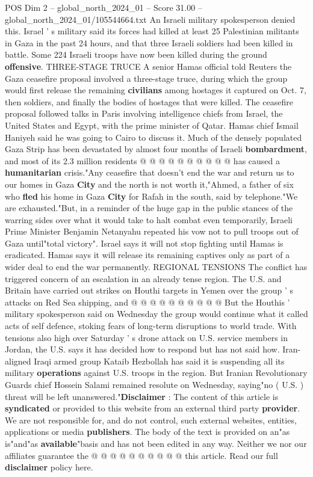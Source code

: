 \begin{textsample}{POS Dim 2 – global\_north\_2024\_01 – Score 31.00 – global\_north\_2024\_01/105544664.txt}
An Israeli military spokesperson denied this.
Israel ' s military said its forces had killed at least 25 Palestinian militants in Gaza in the past 24 hours, and that three Israeli soldiers had been killed in battle.
Some 224 Israeli troops have now been killed during the ground \textbf{offensive}.
THREE-STAGE TRUCE A senior Hamas official told Reuters the Gaza ceasefire proposal involved a three-stage truce, during which the group would first release the remaining \textbf{civilians} among hostages it captured on Oct. 7, then soldiers, and finally the bodies of hostages that were killed.
The ceasefire proposal followed talks in Paris involving intelligence chiefs from Israel, the United States and Egypt, with the prime minister of Qatar.
Hamas chief Ismail Haniyeh said he was going to Cairo to discuss it.
Much of the densely populated Gaza Strip has been devastated by almost four months of Israeli \textbf{bombardment}, and most of its 2.3 million residents @ @ @ @ @ @ @ @ @ @ has caused a \textbf{humanitarian} crisis."Any ceasefire that doesn't end the war and return us to our homes in Gaza \textbf{City} and the north is not worth it,"Ahmed, a father of six who \textbf{fled} his home in Gaza \textbf{City} for Rafah in the south, said by telephone."We are exhausted."But, in a reminder of the huge gap in the public stances of the warring sides over what it would take to halt combat even temporarily, Israeli Prime Minister Benjamin Netanyahu repeated his vow not to pull troops out of Gaza until"total victory".
Israel says it will not stop fighting until Hamas is eradicated.
Hamas says it will release its remaining captives only as part of a wider deal to end the war permanently.
REGIONAL TENSIONS The conflict has triggered concern of an escalation in an already tense region.
The U.S. and Britain have carried out strikes on Houthi targets in Yemen over the group ' s attacks on Red Sea shipping, and @ @ @ @ @ @ @ @ @ @ But the Houthis ' military spokesperson said on Wednesday the group would continue what it called acts of self defence, stoking fears of long-term disruptions to world trade.
With tensions also high over Saturday ' s drone attack on U.S. service members in Jordan, the U.S. says it has decided how to respond but has not said how.
Iran-aligned Iraqi armed group Kataib Hezbollah has said it is suspending all its military \textbf{operations} against U.S. troops in the region.
But Iranian Revolutionary Guards chief Hossein Salami remained resolute on Wednesday, saying"no ( U.S. ) threat will be left unanswered."\textbf{Disclaimer} : The content of this article is \textbf{syndicated} or provided to this website from an external third party \textbf{provider}.
We are not responsible for, and do not control, such external websites, entities, applications or media \textbf{publishers}.
The body of the text is provided on an"as is"and"as \textbf{available}"basis and has not been edited in any way.
Neither we nor our affiliates guarantee the @ @ @ @ @ @ @ @ @ @ this article.
Read our full \textbf{disclaimer} policy here.


\end{textsample}

